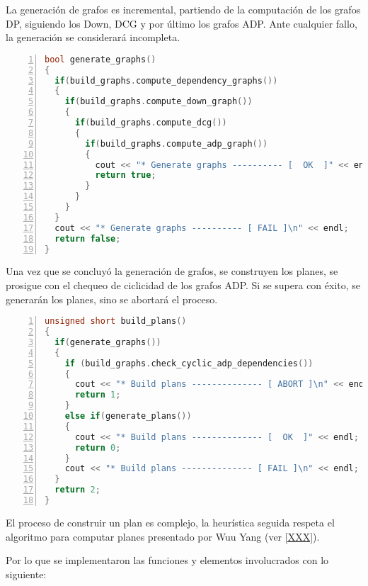 La generación de grafos es incremental, partiendo de la computación de los grafos DP, siguiendo los Down, DCG y por último los grafos ADP. Ante cualquier fallo, la generación se considerará incompleta.

\begin{lstlisting}[language=C++, basicstyle=\scriptsize, numbers=left, columns=fullflexible, linewidth=10.5cm]
bool generate_graphs()
{
  if(build_graphs.compute_dependency_graphs())
  {
    if(build_graphs.compute_down_graph())
    {
      if(build_graphs.compute_dcg())
      {
        if(build_graphs.compute_adp_graph())
        {
          cout << "* Generate graphs ---------- [  OK  ]" << endl;
          return true;
        }
      }
    }
  }
  cout << "* Generate graphs ---------- [ FAIL ]\n" << endl;
  return false;
}
\end{lstlisting}
\vspace{0.3cm}

Una vez que se concluyó la generación de grafos, se construyen los planes, se prosigue con el chequeo de ciclicidad de los grafos ADP. Si se supera con éxito, se generarán los planes, sino se abortará el proceso.

\begin{lstlisting}[language=C++, basicstyle=\scriptsize, numbers=left, columns=fullflexible, linewidth=11cm]
unsigned short build_plans()
{
  if(generate_graphs())
  {
    if (build_graphs.check_cyclic_adp_dependencies())
    {
      cout << "* Build plans -------------- [ ABORT ]\n" << endl;
      return 1;
    }
    else if(generate_plans())
    {
      cout << "* Build plans -------------- [  OK  ]" << endl;
      return 0;
    }
    cout << "* Build plans -------------- [ FAIL ]\n" << endl;
  }
  return 2;
}
\end{lstlisting}
\vspace{0.3cm}

El proceso de construir un plan es complejo, la heurística seguida respeta el algoritmo para computar planes presentado por Wuu Yang (ver \ref{XXX}).

Por lo que se implementaron las funciones y elementos involucrados con lo siguiente:\\

